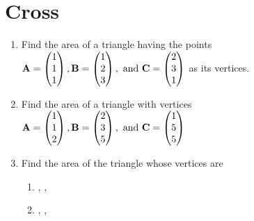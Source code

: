 \documentclass[journal,12pt,twocolumn]{IEEEtran}
\renewcommand\thesection{\arabic{section}}
\renewcommand\thesubsection{\thesection.\arabic{subsection}}
\begin{document}
\section{Cross}
\renewcommand{\theequation}{\theenumi}
\begin{enumerate}[label=\thesection.\arabic*.,ref=\thesection.\theenumi]
%
%
\item Find the area of a triangle having the points 
$
\mathbf{A} = \begin{pmatrix}1\\1 \\1\end{pmatrix},
\mathbf{B} = \begin{pmatrix}1\\2 \\3\end{pmatrix}, \text{ and }
\mathbf{C} = \begin{pmatrix}2\\ 3\\1\end{pmatrix}
$
as its vertices.
\\
\solution
%
%
\item Find the area of a triangle with vertices
$
\mathbf{A} = \begin{pmatrix}1\\1 \\2\end{pmatrix},
\mathbf{B} = \begin{pmatrix}2\\3 \\5\end{pmatrix}, \text{ and }
\mathbf{C} = \begin{pmatrix}1\\ 5\\5\end{pmatrix}
$
\\
\solution
%
%
\item Find the area of the triangle whose vertices are
\begin{enumerate}
\item {}, ,  
\item  {},  ,  
\end{enumerate}
\solution
%


\end{enumerate}
\end{document}
